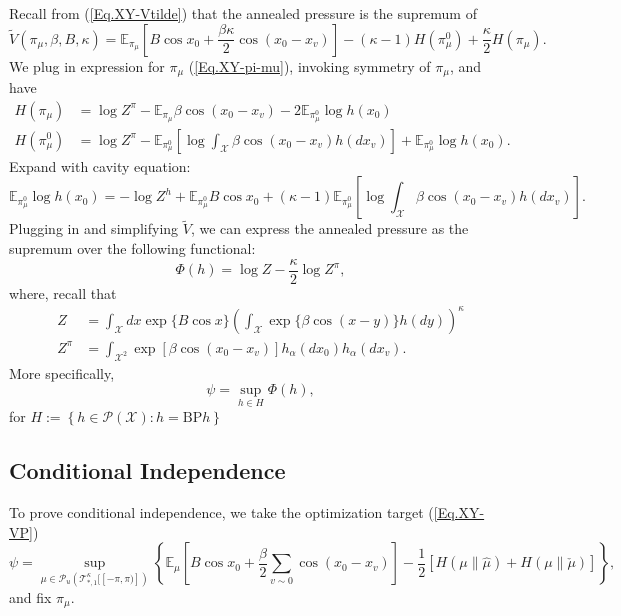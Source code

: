 \documentclass[12pt]{article}
\numberwithin{equation}{section}
\begin{document}
Recall from (\ref{Eq.XY-Vtilde}) that the annealed pressure is the supremum of
\begin{equation*}
    \widetilde{V}(\pi_\mu, \beta, B, \kappa) = \mathbb{E}_{\pi_\mu}\left[B\cos x_0 + \frac{\beta\kappa}{2}\cos(x_0-x_v)\right]
    - (\kappa-1)H(\pi_\mu^0) + \frac\kappa2 H(\pi_\mu).
\end{equation*}
We plug in expression for $\pi_\mu$ (\ref{Eq.XY-pi-mu}), invoking symmetry of $\pi_\mu$, and have
\begin{align*}
    H(\pi_\mu)   & = \log Z^\pi - \mathbb{E}_{\pi_\mu} \beta\cos(x_0-x_v) - 2\mathbb{E}_{\pi_\mu^0} \log h(x_0)                                              \\
    H(\pi_\mu^0) & = \log Z^\pi - \mathbb{E}_{\pi_\mu^0}\left[ \log \int_\mathcal{X} \beta\cos(x_0-x_v) h(dx_v)\right] + \mathbb{E}_{\pi_\mu^0} \log h(x_0).
\end{align*}
Expand with cavity equation:
\begin{equation*}
    \mathbb{E}_{\pi_\mu^0} \log h(x_0) = -\log Z^h + \mathbb{E}_{\pi_\mu^0} B\cos x_0 + (\kappa-1) \mathbb{E}_{\pi_\mu^0} \left[ \log \int_\mathcal{X} \beta\cos(x_0-x_v) h(dx_v)\right].
\end{equation*}
Plugging in and simplifying $\widetilde{V}$, we can express the annealed pressure as the supremum over the following functional:
\begin{equation}
    \Phi(h) = \log Z - \frac\kappa2\log Z^\pi,
    \label{Eq.XY-Bethe-functional}
\end{equation}
where, recall that
\begin{align*}
    Z     & = \int_{\mathcal{X}} dx \exp\{B\cos x\} \left(\int_\mathcal{X}\exp\{\beta\cos(x-y)\}h(dy)\right)^\kappa \\
    Z^\pi & = \int_{\mathcal{X}^2} \exp\left[\beta\cos(x_0- x_v)\right]h_\alpha(dx_0)h_\alpha(dx_v).
\end{align*}
More specifically,
\begin{equation}
    \psi = \sup_{h\in H} \Phi(h),
\end{equation}
for $H := \left\{h\in \mathcal{P}(\mathcal{X}): h = \text{BP}h\right\}$

\subsection{Conditional Independence}

To prove conditional independence, we take the optimization target (\ref{Eq.XY-VP})
\begin{equation*}
    \psi = \sup_{\mu\in\mathcal{P}_u(\mathcal{T}^\kappa_{*, 1}[[-\pi, \pi)])}
    \left\{\mathbb{E}_\mu\left[B\cos x_0+\frac\beta2\sum_{v\sim0}\cos(x_0-x_v)\right]-\frac12[H(\mu\|\hat{\mu})+H(\mu\|\check{\mu})]\right\},
\end{equation*}
and fix $\pi_\mu$.
\end{document}
